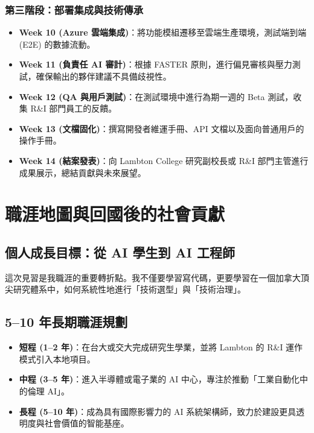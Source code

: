 \documentclass[12pt,a4paper]{article}
\begin{document}
\subsubsection{第三階段：部署集成與技術傳承}
\begin{itemize}
    \item \textbf{Week 10 (Azure 雲端集成)}：將功能模組遷移至雲端生產環境，測試端到端 (E2E) 的數據流動。
    \item \textbf{Week 11 (負責任 AI 審計)}：根據 FASTER 原則，進行偏見審核與壓力測試，確保輸出的夥伴建議不具備歧視性。
    \item \textbf{Week 12 (QA 與用戶測試)}：在測試環境中進行為期一週的 Beta 測試，收集 R\&I 部門員工的反饋。
    \item \textbf{Week 13 (文檔固化)}：撰寫開發者維運手冊、API 文檔以及面向普通用戶的操作手冊。
    \item \textbf{Week 14 (結案發表)}：向 Lambton College 研究副校長或 R\&I 部門主管進行成果展示，總結貢獻與未來展望。
\end{itemize}

\newpage

\newpage

\section{職涯地圖與回國後的社會貢獻}

\subsection{個人成長目標：從 AI 學生到 AI 工程師}

這次見習是我職涯的重要轉折點。我不僅要學習寫代碼，更要學習在一個加拿大頂尖研究體系中，如何系統性地進行「技術選型」與「技術治理」。

\subsection{5--10 年長期職涯規劃}
\begin{itemize}
    \item \textbf{短程 (1--2 年)}：在台大或交大完成研究生學業，並將 Lambton 的 R\&I 運作模式引入本地項目。
    \item \textbf{中程 (3--5 年)}：進入半導體或電子業的 AI 中心，專注於推動「工業自動化中的倫理 AI」。
    \item \textbf{長程 (5--10 年)}：成為具有國際影響力的 AI 系統架構師，致力於建設更具透明度與社會價值的智能基座。
\end{itemize}
\end{document}
